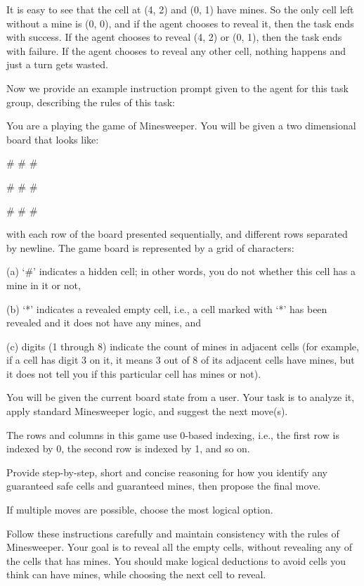 It is easy to see that the cell at (4, 2) and (0, 1) have mines.  So the only cell left without a mine is (0, 0), and if the agent chooses to reveal it, then the task ends with success. If the agent chooses to reveal (4, 2) or (0, 1), then the task ends with failure. If the agent chooses to reveal any other cell, nothing happens and just a turn gets wasted.

\newpage

Now we provide an example instruction prompt given to the agent for this task group, describing the rules of this task:

\begin{tcolorbox}[colback=gray!20, colframe=black, title=Minesweeper Agent Prompt]
You are a playing the game of Minesweeper. You will be given a two dimensional board that looks like: 

\# \# \#

\# \# \#

\# \# \#

with each row of the board presented sequentially, and different rows separated by newline. The game board is represented by a grid of characters: 

(a) `\#' indicates a hidden cell; in other words, you do not whether this cell has a mine in it or not, 

(b) `*' indicates a revealed empty cell, i.e., a cell marked with `*' has been revealed and it does not have any mines, and 

(c) digits (1 through 8) indicate the count of mines in adjacent cells (for example, if a cell has digit 3 on it, it means 3 out of 8 of its adjacent cells have mines, but it does not tell you if this particular cell has mines or not). 

You will be given the current board state from a user. Your task is to analyze it, apply standard Minesweeper logic, and suggest the next move(s).

The rows and columns in this game use 0-based indexing, i.e., the first row is indexed by 0, the second row is indexed by 1, and so on. 

Provide step-by-step, short and concise reasoning for how you identify any guaranteed safe cells and guaranteed mines, then propose the final move. 

If multiple moves are possible, choose the most logical option. 

Follow these instructions carefully and maintain consistency with the rules of Minesweeper. Your goal is to reveal all the empty cells, without revealing any of the cells that has mines. You should make logical deductions to avoid cells you think can have mines, while choosing the next cell to reveal. 


\end{tcolorbox}
